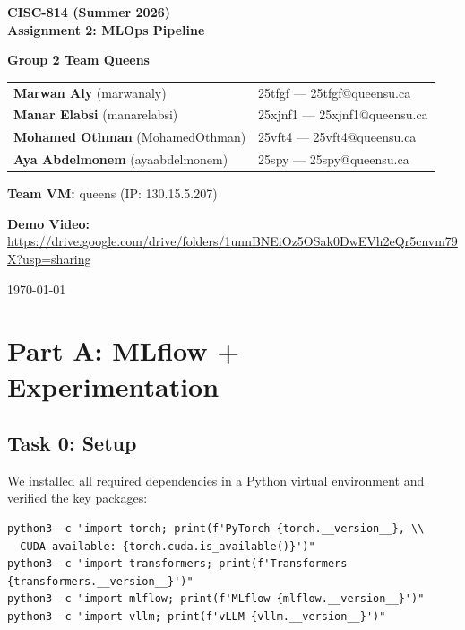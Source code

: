 \documentclass[11pt,a4paper]{article}
\begin{document}
\begin{titlepage}
\centering
\vspace*{1cm}
{\Huge\bfseries CISC-814 (Summer 2026)\\[0.5cm]
Assignment 2: MLOps Pipeline\\[1.5cm]}

{\Large\bfseries Group 2 Team Queens\\[0.5cm]}

{\large
\begin{tabular}{ll}
\textbf{Marwan Aly} (marwanaly) & 25tfgf --- 25tfgf@queensu.ca \\
\textbf{Manar Elabsi} (manarelabsi) & 25xjnf1 --- 25xjnf1@queensu.ca \\
\textbf{Mohamed Othman} (MohamedOthman) & 25vft4 --- 25vft4@queensu.ca \\
\textbf{Aya Abdelmonem} (ayaabdelmonem) & 25spy --- 25spy@queensu.ca \\
\end{tabular}
\vspace{1cm}}

{\large\textbf{Team VM:} queens (IP: 130.15.5.207)\\[0.5cm]}

{\large\textbf{Demo Video:} \url{https://drive.google.com/drive/folders/1unnBNEiOz5OSak0DwEVh2eQr5cnvm79X?usp=sharing}\\[1.5cm]}

{\large\today}
\end{titlepage}

\tableofcontents
\newpage

\section{Part A: MLflow + Experimentation}
\label{sec:part-a}

\subsection{Task 0: Setup}

We installed all required dependencies in a Python virtual environment and verified the key packages:

\begin{verbatim}
python3 -c "import torch; print(f'PyTorch {torch.__version__}, \\
  CUDA available: {torch.cuda.is_available()}')"
python3 -c "import transformers; print(f'Transformers {transformers.__version__}')"
python3 -c "import mlflow; print(f'MLflow {mlflow.__version__}')"
python3 -c "import vllm; print(f'vLLM {vllm.__version__}')"
\end{verbatim}
\end{document}
